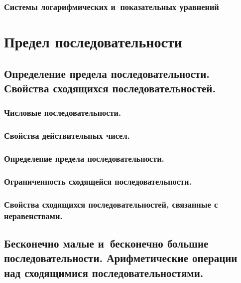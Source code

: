 \documentclass[14pt, oneside]{extbook}
\begin{document}
\subsection{Системы логарифмических и~показательных уравнений}



\chapter{Предел последовательности}
\section{Определение предела последовательности. \\
Свойства сходящихся последовательностей.}
\subsection{Числовые последовательности.}

\subsection{Свойства действительных чисел.}

\subsection{Определение предела последовательности.}

\subsection{Ограниченность сходящейся последовательности.}

\subsection{Свойства сходящихся последовательностей, связанные с неравенствами.}

\section{Бесконечно малые и~бесконечно большие последовательности.
Арифметические операции над сходящимися последовательностями.}
\end{document}
